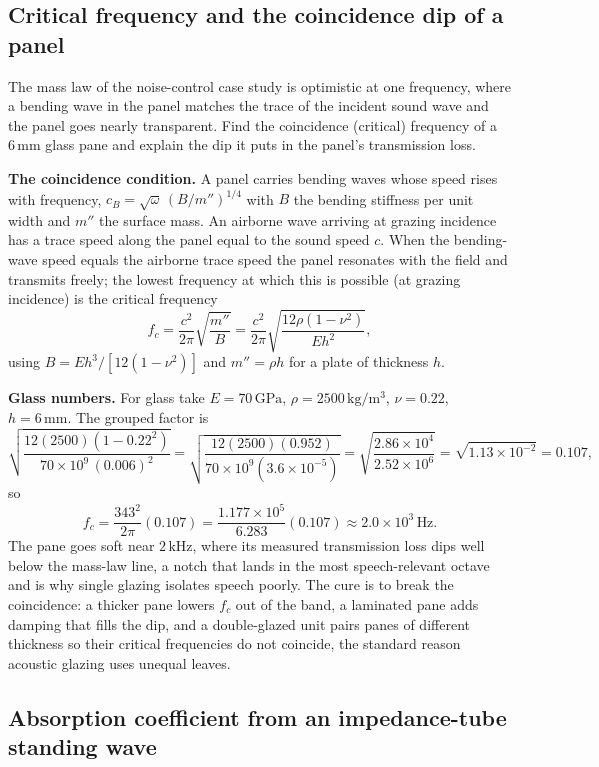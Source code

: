 \subsection{Critical frequency and the coincidence dip of a panel}

The mass law of the noise-control case study is optimistic at one
frequency, where a bending wave in the panel matches the trace of the
incident sound wave and the panel goes nearly transparent. Find the
coincidence (critical) frequency of a $6\,\si{\milli\meter}$ glass pane and
explain the dip it puts in the panel's transmission loss.

\textbf{The coincidence condition.} A panel carries bending waves whose
speed rises with frequency, $c_B = \sqrt{\omega}\,(B/m'')^{1/4}$ with $B$
the bending stiffness per unit width and $m''$ the surface mass. An
airborne wave arriving at grazing incidence has a trace speed along the
panel equal to the sound speed $c$. When the bending-wave speed equals the
airborne trace speed the panel resonates with the field and transmits
freely; the lowest frequency at which this is possible (at grazing
incidence) is the critical frequency
\[
f_c = \frac{c^2}{2\pi}\sqrt{\frac{m''}{B}}
    = \frac{c^2}{2\pi}\sqrt{\frac{12\rho(1-\nu^2)}{E h^2}},
\]
using $B = E h^3/[12(1-\nu^2)]$ and $m'' = \rho h$ for a plate of
thickness $h$.

\textbf{Glass numbers.} For glass take $E = 70\,\si{\giga\pascal}$,
$\rho = 2500\,\si{\kilogram\per\meter\cubed}$, $\nu = 0.22$,
$h = 6\,\si{\milli\meter}$. The grouped factor is
\[
\sqrt{\frac{12(2500)(1-0.22^2)}{70\times 10^{9}\,(0.006)^2}}
= \sqrt{\frac{12(2500)(0.952)}{70\times 10^{9}(3.6\times 10^{-5})}}
= \sqrt{\frac{2.86\times 10^{4}}{2.52\times 10^{6}}}
= \sqrt{1.13\times 10^{-2}} = 0.107,
\]
so
\[
f_c = \frac{343^2}{2\pi}(0.107)
    = \frac{1.177\times 10^{5}}{6.283}(0.107)
    \approx 2.0\times 10^{3}\,\si{\hertz}.
\]
The pane goes soft near $2\,\si{\kilo\hertz}$, where its measured
transmission loss dips well below the mass-law line, a notch that lands in
the most speech-relevant octave and is why single glazing isolates speech
poorly. The cure is to break the coincidence: a thicker pane lowers $f_c$
out of the band, a laminated pane adds damping that fills the dip, and a
double-glazed unit pairs panes of different thickness so their critical
frequencies do not coincide, the standard reason acoustic glazing uses
unequal leaves.

\subsection{Absorption coefficient from an impedance-tube standing wave}


